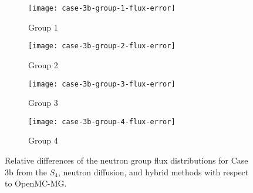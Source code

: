 \begin{figure}[htb!]
  \centering
  \begin{subfigure}[t]{.49\textwidth}
    \centering
    \texttt{[image: case-3b-group-1-flux-error]}
    \caption{Group 1}
    \label{fig:c3bg1e}
  \end{subfigure}
  \hfill
  \begin{subfigure}[t]{.49\textwidth}
    \centering
    \texttt{[image: case-3b-group-2-flux-error]}
    \caption{Group 2}
    \label{fig:c3bg2e}
  \end{subfigure}
  \hfill
  \begin{subfigure}[t]{.49\textwidth}
    \centering
    \texttt{[image: case-3b-group-3-flux-error]}
    \caption{Group 3}
    \label{fig:c3bg3e}
  \end{subfigure}
  \hfill
  \begin{subfigure}[t]{.49\textwidth}
    \centering
    \texttt{[image: case-3b-group-4-flux-error]}
    \caption{Group 4}
    \label{fig:c3bg4e}
  \end{subfigure}
  \caption{Relative differences of the neutron group flux distributions for Case 3b from the $S_4$,
    neutron diffusion, and hybrid methods with respect to OpenMC-MG.}
  \label{fig:c3bfluxe}
\end{figure}

